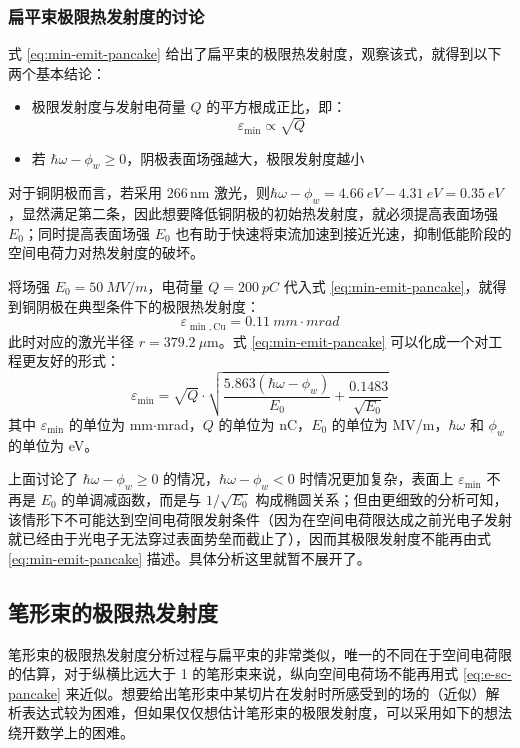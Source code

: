 \subsubsection{扁平束极限热发射度的讨论}
式 \ref{eq:min-emit-pancake} 给出了扁平束的极限热发射度，观察该式，就得到以下两个基本结论：
\begin{itemize}
\item 极限发射度与发射电荷量 $Q$ 的平方根成正比，即：
\begin{equation}
\varepsilon_{\min} \propto \sqrt{Q}
\end{equation}
\item 若 $\hbar\omega-\phi_w \ge 0$，阴极表面场强越大，极限发射度越小
\end{itemize}
对于铜阴极而言，若采用 266\,nm 激光，则$\hbar\omega-\phi_w = \SI{4.66}{eV}-\SI{4.31}{eV} = \SI{0.35}{eV}$，显然满足第二条，因此想要降低铜阴极的初始热发射度，就必须提高表面场强 $E_0$；同时提高表面场强 $E_0$ 也有助于快速将束流加速到接近光速，抑制低能阶段的空间电荷力对热发射度的破坏。

将场强 $E_0=\SI{50}{MV/m}$，电荷量 $Q=\SI{200}{pC}$ 代入式 \ref{eq:min-emit-pancake}，就得到铜阴极在典型条件下的极限热发射度：
\begin{equation}
\varepsilon_{\min, \text{Cu}} = \SI{0.11}{mm\cdot mrad}
\end{equation}
此时对应的激光半径 $r=\SI{379.2}{\mu\meter}$。式 \ref{eq:min-emit-pancake} 可以化成一个对工程更友好的形式：
\begin{equation}
\varepsilon_{\min} = \sqrt{Q}\cdot\sqrt{\frac{5.863(\hbar\omega-\phi_w)}{E_0}+\frac{0.1483}{\sqrt{E_0}}}
\label{eq:min-emit-pancake-eig}
\end{equation}
其中 $\varepsilon_{\min}$ 的单位为 mm$\cdot$mrad，$Q$ 的单位为 nC，$E_0$ 的单位为 MV/m，$\hbar\omega$ 和 $\phi_w$ 的单位为 eV。

上面讨论了 $\hbar\omega-\phi_w \ge 0$ 的情况，$\hbar\omega-\phi_w < 0$ 时情况更加复杂，表面上 $\varepsilon_{\min}$ 不再是 $E_0$ 的单调减函数，而是与 $1/\sqrt{E_0}$ 构成椭圆关系；但由更细致的分析可知，该情形下不可能达到空间电荷限发射条件（因为在空间电荷限达成之前光电子发射就已经由于光电子无法穿过表面势垒而截止了），因而其极限发射度不能再由式 \ref{eq:min-emit-pancake} 描述。具体分析这里就暂不展开了。

\subsection{笔形束的极限热发射度}
笔形束的极限热发射度分析过程与扁平束的非常类似，唯一的不同在于空间电荷限的估算，对于纵横比远大于 1 的笔形束来说，纵向空间电荷场不能再用式 \ref{eq:e-sc-pancake} 来近似。想要给出笔形束中某切片在发射时所感受到的场的（近似）解析表达式较为困难，但如果仅仅想估计笔形束的极限发射度，可以采用如下的想法绕开数学上的困难。

